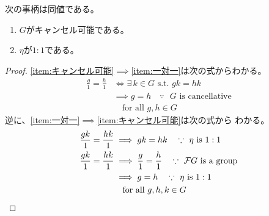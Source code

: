 {	\begin{proposition}[分数化の単位とキャンセル可能性]
	\label{prop:分数化の単位とキャンセル可能性} %
		次の事柄は同値である。
		\begin{enumerate}\setlength{\itemsep}{-1mm} %
			\item\label{item:キャンセル可能} $G$がキャンセル可能である。
			\item\label{item:一対一} $\eta$が$1:1$である。
		\end{enumerate} %
	\end{proposition} %
	\begin{proof} %
		\ref{item:キャンセル可能}$\implies$\ref{item:一対一}は次の式からわかる。
		\begin{equation*}\begin{split}
			\frac{g}{1} = \frac{h}{1} 
			&\iff \exists\, k\in G \text{ s.t. } gk = hk \\
			&\implies g = h \quad\because\text{ $G$ is cancellative} \\
			&\quad\text{for all } g,h\in G
		\end{split}\end{equation*}
		逆に、\ref{item:一対一}$\implies$\ref{item:キャンセル可能}は次の式から
		わかる。
		\begin{equation*}\begin{split}
			\frac{gk}{1} = \frac{hk}{1}
			& \implies gk = hk \quad\because\text{ $\eta$ is $1:1$} \\
			\frac{gk}{1} = \frac{hk}{1}
			& \implies \frac{g}{1} = \frac{h}{1} 
			\quad\because\text{ $\mathcal{F} G$ is a group} \\
			& \implies g = h \quad\because\text{ $\eta$ is $1:1$} \\
			&\quad\text{for all } g,h,k\in G
		\end{split}\end{equation*}
	\end{proof} %

}
